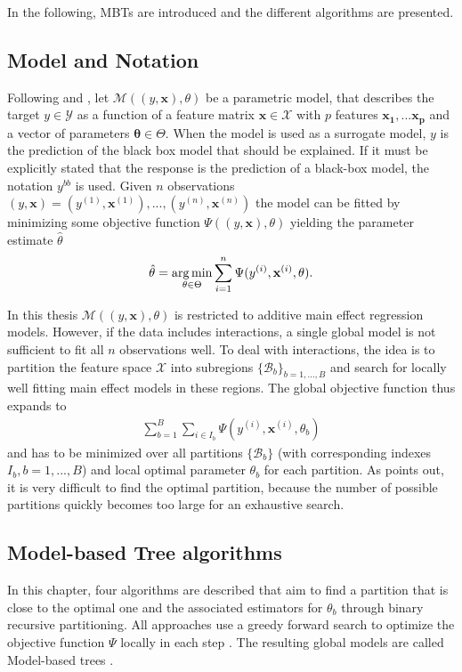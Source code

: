 In the following, MBTs are introduced and the different algorithms are presented.

\subsection{Model and Notation}
Following \citep{Zeileis.2008} and \citep{Seibold.2016}, let $\mathcal{M}((y, \mathbf{x}), \theta)$ be a parametric model, that describes the target $y \in \mathcal{Y}$ as a function of a feature matrix $\mathbf{x}\in \mathcal{X}$ with $p$ features $\mathbf{x_1}, ... \mathbf{x_p} $  and a vector of parameters $\mathbf{\theta} \in \Theta$. When the model is used as a surrogate model, $y$ is the prediction of the black box model that should be explained.  If it must be explicitly stated that the response is the prediction of a black-box model, the notation $y^{bb}$ is used. Given $n$ observations $(y, \mathbf{x}) = (y^{(1)}, \mathbf{x}^{(1)}),..., (y^{(n)}, \mathbf{x}^{(n)})$ the model can be fitted by minimizing some objective function $\Psi((y, \mathbf{x}), \theta)$ yielding the parameter estimate $\hat{\theta}$
\begin{align}
    \hat{\mathbf{\theta}} = \operatorname*{arg\,min}_{\theta \in \Theta} \sum_{i=1}^{n}\Psi(y^{(i)}, \mathbf{x}^{(i)}, \theta).
\end{align}

In this thesis $\mathcal{M}((y, \mathbf{x}), \theta)$ is restricted to additive main effect regression models. However, if the data includes interactions, a single global model is not sufficient to fit all $n$ observations well.  To deal with interactions, the idea is to partition the feature space $\mathcal{X}$ into subregions $\{\mathcal{B}_b\}_{b = 1,...,B}$ and search for locally well fitting main effect models in these regions. The global objective function thus expands to
\begin{align}
    \sum_{b=1}^B\sum_{i \in I_b}\Psi(y^{(i)}, \mathbf{x}^{(i)}, \theta_b)
\end{align}
and has to be minimized over all partitions $\{\mathcal{B}_b\}$ (with corresponding indexes $I_b, b = 1,...,B$) and local optimal parameter $\theta_b$ for each partition. As \citep{Zeileis.2008} points out, it is very difficult to find the optimal partition, because the number of possible partitions quickly becomes too large for an exhaustive search.





\subsection{Model-based Tree algorithms}
In this chapter, four algorithms are described that aim to find a partition that is close to the optimal one and the associated estimators for $\theta_b$ through binary recursive partitioning. All approaches use a greedy forward search to optimize the objective function $\Psi$ locally in each step \citep{Zeileis.2008}.  
The resulting global models are called Model-based trees .



